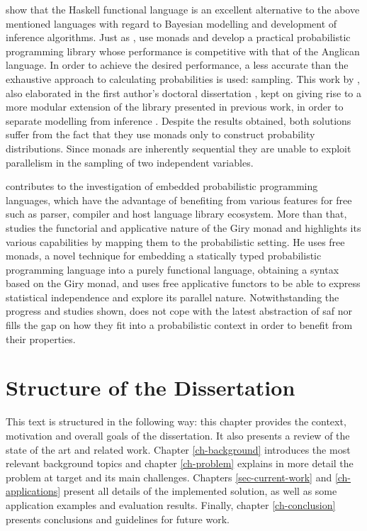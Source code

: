 \documentclass[
  oneside,
  11pt, a4paper,
  footinclude=true,
  headinclude=true,
  cleardoublepage=empty
]{scrbook}
\theoremstyle{definition}
\theoremstyle{definition}
\begin{document}
        \cite{Scibior:2015:PPP:2887747.2804317} show that the Haskell functional language is an excellent alternative to the above mentioned languages with regard to Bayesian modelling and development of inference algorithms. Just as \cite{erwig_kollmansberger_2006}, \cite{Scibior:2015:PPP:2887747.2804317} use monads and develop a practical probabilistic programming library whose performance is competitive with that of the Anglican language. In order to achieve the desired performance, a less accurate than the exhaustive approach to calculating probabilities is used: sampling. This work by \cite{Scibior:2015:PPP:2887747.2804317}, also elaborated in the first author's doctoral dissertation \citep{Scibior19}, kept on giving rise to a more modular extension of the library presented in previous work, in order to separate modelling from inference \citep{scibior2018functional}. Despite the results obtained, both solutions suffer from the fact that they use monads only to construct probability distributions. Since monads are inherently sequential they are unable to exploit parallelism in the sampling of two independent variables.
                
        \cite{jtobin} contributes to the investigation of embedded probabilistic programming languages, which have the advantage of benefiting from various features for free such as parser, compiler and host language library ecosystem. More than that, \cite{jtobin} studies the functorial and applicative nature of the Giry monad and highlights its various capabilities by mapping them to the probabilistic setting. He uses free monads, a novel technique for embedding a statically typed probabilistic programming language into a purely functional language, obtaining a syntax based on the Giry monad, and uses free applicative functors to be able to express statistical independence and explore its parallel nature. Notwithstanding the progress and studies shown, \cite{jtobin} does not cope with the latest abstraction of \gls{saf} nor fills the gap on how they fit into a probabilistic context in order to benefit from their properties.
        
    \section{Structure of the Dissertation}
    
    This text is structured in the following way: this chapter provides the context, motivation and overall goals of the dissertation. It also presents a review of the state of the art and related work.
    Chapter \ref{ch-background} introduces the most relevant background topics and chapter \ref{ch-problem} explains in more detail the problem at target and its main challenges. Chapters \ref{sec-current-work} and \ref{ch-applications} present all details of the implemented solution, as well as some application examples and evaluation results. Finally, chapter \ref{ch-conclusion} presents conclusions and guidelines for future work.
    
\end{document}
